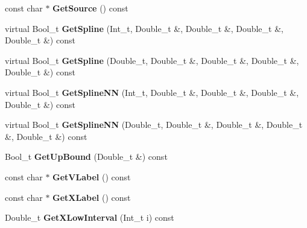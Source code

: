 \begin{DoxyCompactItemize}
\item 
\hypertarget{classTSplineFit_a853b3d6506a8edc4d10d9aac0aedc072}{const char $\ast$ {\bfseries Get\-Source} () const }\label{classTSplineFit_a853b3d6506a8edc4d10d9aac0aedc072}

\item 
\hypertarget{classTSplineFit_a04f8bf2936490060792eee0b1bcd1af3}{virtual Bool\-\_\-t {\bfseries Get\-Spline} (Int\-\_\-t, Double\-\_\-t \&, Double\-\_\-t \&, Double\-\_\-t \&, Double\-\_\-t \&) const }\label{classTSplineFit_a04f8bf2936490060792eee0b1bcd1af3}

\item 
\hypertarget{classTSplineFit_ae99ef60ad1ae1c5135b80f2ae02252f1}{virtual Bool\-\_\-t {\bfseries Get\-Spline} (Double\-\_\-t, Double\-\_\-t \&, Double\-\_\-t \&, Double\-\_\-t \&, Double\-\_\-t \&) const }\label{classTSplineFit_ae99ef60ad1ae1c5135b80f2ae02252f1}

\item 
\hypertarget{classTSplineFit_ac3fa3716c48104f30fcccc61de928a95}{virtual Bool\-\_\-t {\bfseries Get\-Spline\-N\-N} (Int\-\_\-t, Double\-\_\-t \&, Double\-\_\-t \&, Double\-\_\-t \&, Double\-\_\-t \&) const }\label{classTSplineFit_ac3fa3716c48104f30fcccc61de928a95}

\item 
\hypertarget{classTSplineFit_a37410bb337b4a7e702d7ce3ac7dfdc6e}{virtual Bool\-\_\-t {\bfseries Get\-Spline\-N\-N} (Double\-\_\-t, Double\-\_\-t \&, Double\-\_\-t \&, Double\-\_\-t \&, Double\-\_\-t \&) const }\label{classTSplineFit_a37410bb337b4a7e702d7ce3ac7dfdc6e}

\item 
\hypertarget{classTSplineFit_a263d0e66b822b4e51e2f6b33cb173496}{Bool\-\_\-t {\bfseries Get\-Up\-Bound} (Double\-\_\-t \&) const }\label{classTSplineFit_a263d0e66b822b4e51e2f6b33cb173496}

\item 
\hypertarget{classTSplineFit_a6809425984906a55741c0efd4c867fd4}{const char $\ast$ {\bfseries Get\-V\-Label} () const }\label{classTSplineFit_a6809425984906a55741c0efd4c867fd4}

\item 
\hypertarget{classTSplineFit_ade7f58f735178db7f90f380975475964}{const char $\ast$ {\bfseries Get\-X\-Label} () const }\label{classTSplineFit_ade7f58f735178db7f90f380975475964}

\item 
\hypertarget{classTSplineFit_a8b44e467188c0826da7f291784fadfb2}{Double\-\_\-t {\bfseries Get\-X\-Low\-Interval} (Int\-\_\-t i) const }\label{classTSplineFit_a8b44e467188c0826da7f291784fadfb2}


\end{DoxyCompactItemize}
